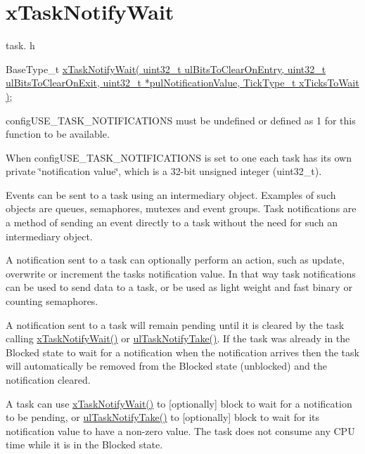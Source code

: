 \hypertarget{group__x_task_notify_wait}{}\section{x\+Task\+Notify\+Wait}
\label{group__x_task_notify_wait}
task. h 
\begin{DoxyPre}BaseType\_t \hyperlink{vendor_2ceedling_2plugins_2freertos_2src_2freertos_2include_2task_8h_a0475fcda9718f403521c270a7270ff93}{xTaskNotifyWait( uint32\_t ulBitsToClearOnEntry, uint32\_t ulBitsToClearOnExit, uint32\_t *pulNotificationValue, TickType\_t xTicksToWait )};\end{DoxyPre}


config\+U\+S\+E\+\_\+\+T\+A\+S\+K\+\_\+\+N\+O\+T\+I\+F\+I\+C\+A\+T\+I\+O\+NS must be undefined or defined as 1 for this function to be available.

When config\+U\+S\+E\+\_\+\+T\+A\+S\+K\+\_\+\+N\+O\+T\+I\+F\+I\+C\+A\+T\+I\+O\+NS is set to one each task has its own private \char`\"{}notification value\char`\"{}, which is a 32-\/bit unsigned integer (uint32\+\_\+t).

Events can be sent to a task using an intermediary object. Examples of such objects are queues, semaphores, mutexes and event groups. Task notifications are a method of sending an event directly to a task without the need for such an intermediary object.

A notification sent to a task can optionally perform an action, such as update, overwrite or increment the task\textquotesingle{}s notification value. In that way task notifications can be used to send data to a task, or be used as light weight and fast binary or counting semaphores.

A notification sent to a task will remain pending until it is cleared by the task calling \hyperlink{vendor_2ceedling_2plugins_2freertos_2src_2freertos_2include_2task_8h_a0475fcda9718f403521c270a7270ff93}{x\+Task\+Notify\+Wait()} or \hyperlink{vendor_2ceedling_2plugins_2freertos_2src_2freertos_2include_2task_8h_a66540bef602522a01a519f776e4c07d8}{ul\+Task\+Notify\+Take()}. If the task was already in the Blocked state to wait for a notification when the notification arrives then the task will automatically be removed from the Blocked state (unblocked) and the notification cleared.

A task can use \hyperlink{vendor_2ceedling_2plugins_2freertos_2src_2freertos_2include_2task_8h_a0475fcda9718f403521c270a7270ff93}{x\+Task\+Notify\+Wait()} to \mbox{[}optionally\mbox{]} block to wait for a notification to be pending, or \hyperlink{vendor_2ceedling_2plugins_2freertos_2src_2freertos_2include_2task_8h_a66540bef602522a01a519f776e4c07d8}{ul\+Task\+Notify\+Take()} to \mbox{[}optionally\mbox{]} block to wait for its notification value to have a non-\/zero value. The task does not consume any C\+PU time while it is in the Blocked state.

